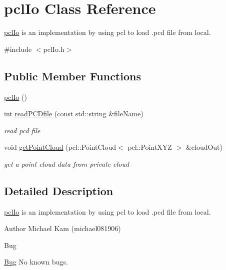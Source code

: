 \hypertarget{classpclIo}{}\section{pcl\+Io Class Reference}
\label{classpclIo}


\hyperlink{classpclIo}{pcl\+Io} is an implementation by using pcl to load .pcd file from local.
\begin{DoxyItemize}
\item 
\end{DoxyItemize} 




{\ttfamily \#include $<$pcl\+Io.\+h$>$}

\subsection*{Public Member Functions}
\begin{DoxyCompactItemize}
\item 
\hyperlink{classpclIo_afa4cdfe63ff1b142d15e2926afdb1e4b}{pcl\+Io} ()
\item 
int \hyperlink{classpclIo_a37ade0d99bf4ce043df990a605608ed4}{read\+P\+C\+Dfile} (const std\+::string \&file\+Name)
\begin{DoxyCompactList}\small\item\em read pcd file \end{DoxyCompactList}\item 
void \hyperlink{classpclIo_a6dda8313faa0a9647d56836f01666504}{get\+Point\+Cloud} (pcl\+::\+Point\+Cloud$<$ pcl\+::\+Point\+X\+YZ $>$ \&cloud\+Out)
\begin{DoxyCompactList}\small\item\em get a point cloud data from private cloud \end{DoxyCompactList}\end{DoxyCompactItemize}


\subsection{Detailed Description}
\hyperlink{classpclIo}{pcl\+Io} is an implementation by using pcl to load .pcd file from local.
\begin{DoxyItemize}
\item 
\end{DoxyItemize}

\begin{DoxyAuthor}{Author}
Michael Kam (michael081906) 
\end{DoxyAuthor}
\begin{DoxyRefDesc}{Bug}
\item[\hyperlink{bug__bug000008}{Bug}]No known bugs. \end{DoxyRefDesc}


